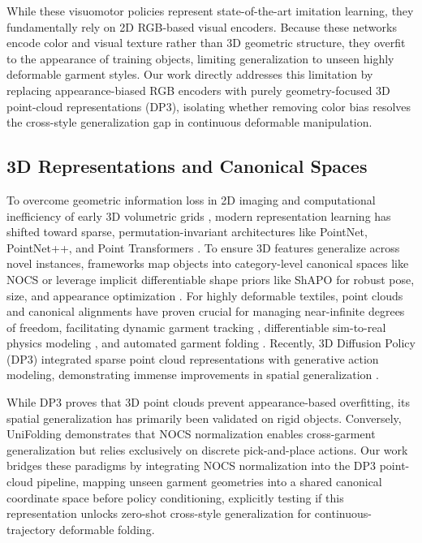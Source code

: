While these visuomotor policies represent state-of-the-art imitation learning, they fundamentally rely on 2D RGB-based visual encoders. Because these networks encode color and visual texture rather than 3D geometric structure, they overfit to the appearance of training objects, limiting generalization to unseen highly deformable garment styles. Our work directly addresses this limitation by replacing appearance-biased RGB encoders with purely geometry-focused 3D point-cloud representations (DP3), isolating whether removing color bias resolves the cross-style generalization gap in continuous deformable manipulation.

\subsection{3D Representations and Canonical Spaces}
To overcome geometric information loss in 2D imaging and computational inefficiency of early 3D volumetric grids \cite{wu20153dshapenetsdeeprepresentation}, modern representation learning has shifted toward sparse, permutation-invariant architectures like PointNet, PointNet++, and Point Transformers \cite{qi2017pointnetdeeplearningpoint, qi2017pointnet2, zhao2021pointtransformer}. To ensure 3D features generalize across novel instances, frameworks map objects into category-level canonical spaces like NOCS \cite{wang2019normalized} or leverage implicit differentiable shape priors like ShAPO for robust pose, size, and appearance optimization \cite{irshad2022shapoimplicitrepresentationsmultiobject}. For highly deformable textiles, point clouds and canonical alignments have proven crucial for managing near-infinite degrees of freedom, facilitating dynamic garment tracking \cite{xue2025garmenttrackingcategorylevelgarmentpose}, differentiable sim-to-real physics modeling \cite{sundaresan2025diffcloudrealtosimpointclouds}, and automated garment folding \cite{unifolding2023}. Recently, 3D Diffusion Policy (DP3) integrated sparse point cloud representations with generative action modeling, demonstrating immense improvements in spatial generalization \cite{ze2024dp3}.

While DP3 proves that 3D point clouds prevent appearance-based overfitting, its spatial generalization has primarily been validated on rigid objects. Conversely, UniFolding demonstrates that NOCS normalization enables cross-garment generalization but relies exclusively on discrete pick-and-place actions. Our work bridges these paradigms by integrating NOCS normalization into the DP3 point-cloud pipeline, mapping unseen garment geometries into a shared canonical coordinate space before policy conditioning, explicitly testing if this representation unlocks zero-shot cross-style generalization for continuous-trajectory deformable folding.

